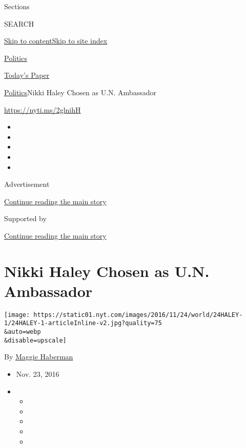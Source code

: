 Sections

SEARCH

\protect\hyperlink{site-content}{Skip to
content}\protect\hyperlink{site-index}{Skip to site index}

\href{https://www.nytimes.com/section/politics}{Politics}

\href{https://myaccount.nytimes.com/auth/login?response_type=cookie\&client_id=vi}{}

\href{https://www.nytimes.com/section/todayspaper}{Today's Paper}

\href{/section/politics}{Politics}\textbar{}Nikki Haley Chosen as U.N.
Ambassador

\url{https://nyti.ms/2glnihH}

\begin{itemize}
\item
\item
\item
\item
\item
\end{itemize}

Advertisement

\protect\hyperlink{after-top}{Continue reading the main story}

Supported by

\protect\hyperlink{after-sponsor}{Continue reading the main story}

\hypertarget{nikki-haley-chosen-as-un-ambassador}{%
\section{Nikki Haley Chosen as U.N.
Ambassador}\label{nikki-haley-chosen-as-un-ambassador}}

\texttt{[image: https://static01.nyt.com/images/2016/11/24/world/24HALEY-1/24HALEY-1-articleInline-v2.jpg?quality=75\\\&auto=webp\\\&disable=upscale]}

By \href{http://www.nytimes.com/by/maggie-haberman}{Maggie Haberman}

\begin{itemize}
\item
  Nov. 23, 2016
\item
  \begin{itemize}
  \item
  \item
  \item
  \item
  \item
  \end{itemize}
\end{itemize}

